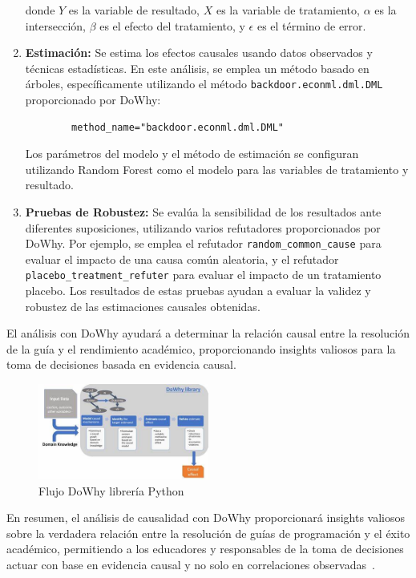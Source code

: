 \begin{enumerate}
    donde \( Y \) es la variable de resultado, \( X \) es la variable de tratamiento, \( \alpha \) es la intersección, \( \beta \) es el efecto del tratamiento, y \( \epsilon \) es el término de error.

    \item \textbf{Estimación:} Se estima los efectos causales usando datos observados y técnicas estadísticas. En este análisis, se emplea un método basado en árboles, específicamente utilizando el método \texttt{backdoor.econml.dml.DML} proporcionado por DoWhy:
    \begin{verbatim}
        method_name="backdoor.econml.dml.DML"
    \end{verbatim}
    Los parámetros del modelo y el método de estimación se configuran utilizando Random Forest como el modelo para las variables de tratamiento y resultado.

    \item \textbf{Pruebas de Robustez:} Se evalúa la sensibilidad de los resultados ante diferentes suposiciones, utilizando varios refutadores proporcionados por DoWhy. Por ejemplo, se emplea el refutador \texttt{random\_common\_cause} para evaluar el impacto de una causa común aleatoria, y el refutador \texttt{placebo\_treatment\_refuter} para evaluar el impacto de un tratamiento placebo. Los resultados de estas pruebas ayudan a evaluar la validez y robustez de las estimaciones causales obtenidas.

\end{enumerate}

El análisis con DoWhy ayudará a determinar la relación causal entre la resolución de la guía y el rendimiento académico, proporcionando insights valiosos para la toma de decisiones basada en evidencia causal.

\begin{figure}[H]
  \centering
  \includegraphics[width=0.5\textwidth]{img/dowhy.jpg}
  \caption{Flujo DoWhy librería Python}
  \label{fig:dowhy_lib}
\end{figure}

En resumen, el análisis de causalidad con DoWhy proporcionará insights valiosos sobre la verdadera relación entre la resolución de guías de programación y el éxito académico, permitiendo a los educadores y responsables de la toma de decisiones actuar con base en evidencia causal y no solo en correlaciones observadas~\cite{sharma2021dowhy}.



